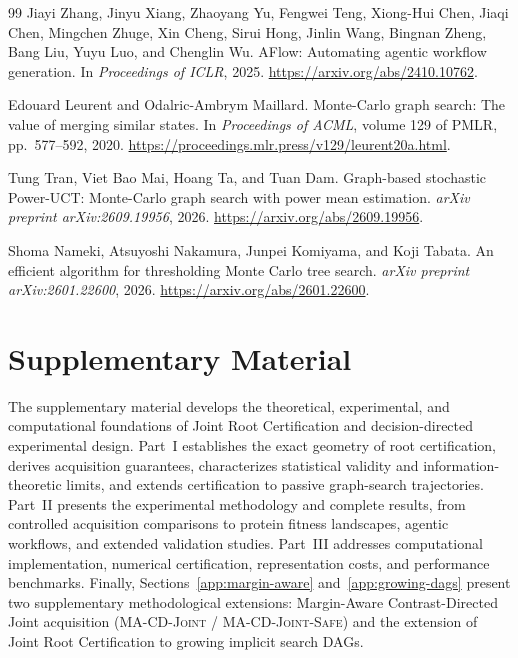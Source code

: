 \documentclass{article}
\theoremstyle{plain}
\theoremstyle{definition}
\begin{document}
\begin{thebibliography}{99}
Jiayi Zhang, Jinyu Xiang, Zhaoyang Yu, Fengwei Teng, Xiong-Hui Chen, Jiaqi Chen, Mingchen Zhuge, Xin Cheng, Sirui Hong, Jinlin Wang, Bingnan Zheng, Bang Liu, Yuyu Luo, and Chenglin Wu.
AFlow: Automating agentic workflow generation.
In \emph{Proceedings of ICLR}, 2025.
\url{https://arxiv.org/abs/2410.10762}.

Edouard Leurent and Odalric-Ambrym Maillard.
Monte-Carlo graph search: The value of merging similar states.
In \emph{Proceedings of ACML}, volume 129 of PMLR,
pp.\ 577--592, 2020.
\url{https://proceedings.mlr.press/v129/leurent20a.html}.

Tung Tran, Viet Bao Mai, Hoang Ta, and Tuan Dam.
Graph-based stochastic Power-UCT: Monte-Carlo graph search
with power mean estimation.
\emph{arXiv preprint arXiv:2609.19956}, 2026.
\url{https://arxiv.org/abs/2609.19956}.

Shoma Nameki, Atsuyoshi Nakamura, Junpei Komiyama, and Koji Tabata.
An efficient algorithm for thresholding Monte Carlo tree search.
\emph{arXiv preprint arXiv:2601.22600}, 2026.
\url{https://arxiv.org/abs/2601.22600}.

\end{thebibliography}

\clearpage
\appendix
\section*{Supplementary Material}
\noindent
The supplementary material develops the theoretical, experimental,
and computational foundations of Joint Root Certification and
decision-directed experimental design. Part~I establishes the exact
geometry of root certification, derives acquisition guarantees,
characterizes statistical validity and information-theoretic limits,
and extends certification to passive graph-search trajectories.
Part~II presents the experimental methodology and complete results,
from controlled acquisition comparisons to protein fitness landscapes,
agentic workflows, and extended validation studies.
Part~III addresses computational implementation, numerical certification,
representation costs, and performance benchmarks.
Finally, Sections~\ref{app:margin-aware} and~\ref{app:growing-dags}
present two supplementary methodological extensions: Margin-Aware
Contrast-Directed Joint acquisition (\textsc{MA-CD-Joint} /
\textsc{MA-CD-Joint-Safe}) and the extension of Joint Root Certification
to growing implicit search DAGs.
\end{document}
